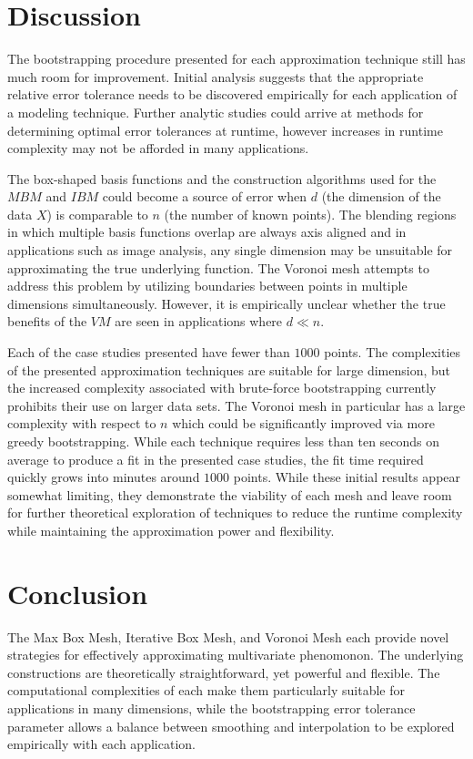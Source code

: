 \documentclass[smallextended]{svjour3}       %
\begin{document}
\section{Discussion}

The bootstrapping procedure presented for each approximation technique still has much room for improvement. Initial analysis suggests that the appropriate relative error tolerance needs to be discovered empirically for each application of a modeling technique. Further analytic studies could arrive at methods for determining optimal error tolerances at runtime, however increases in runtime complexity may not be afforded in many applications. 

The box-shaped basis functions and the construction algorithms used for the $MBM$ and $IBM$ could become a source of error when $d$ (the dimension of the data $X$) is comparable to $n$ (the number of known points). The blending regions in which multiple basis functions overlap are always axis aligned and in applications such as image analysis, any single dimension may be unsuitable for approximating the true underlying function. The Voronoi mesh attempts to address this problem by utilizing boundaries between points in multiple dimensions simultaneously. However, it is empirically unclear whether the true benefits of the $VM$ are seen in applications where $d \ll n$.

Each of the case studies presented have fewer than $1000$ points. The complexities of the presented approximation techniques are suitable for large dimension, but the increased complexity associated with brute-force bootstrapping currently prohibits their use on larger data sets. The Voronoi mesh in particular has a large complexity with respect to $n$ which could be significantly improved via more greedy bootstrapping. While each technique requires less than ten seconds on average to produce a fit in the presented case studies, the fit time required quickly grows into minutes around $1000$ points. While these initial results appear somewhat limiting, they demonstrate the viability of each mesh and leave room for further theoretical exploration of techniques to reduce the runtime complexity while maintaining the approximation power and flexibility.

\section{Conclusion}

The Max Box Mesh, Iterative Box Mesh, and Voronoi Mesh each provide novel strategies for effectively approximating multivariate phenomonon. The underlying constructions are theoretically straightforward, yet powerful and flexible. The computational complexities of each make them particularly suitable for applications in many dimensions, while the bootstrapping error tolerance parameter allows a balance between smoothing and interpolation to be explored empirically with each application.
\end{document}

